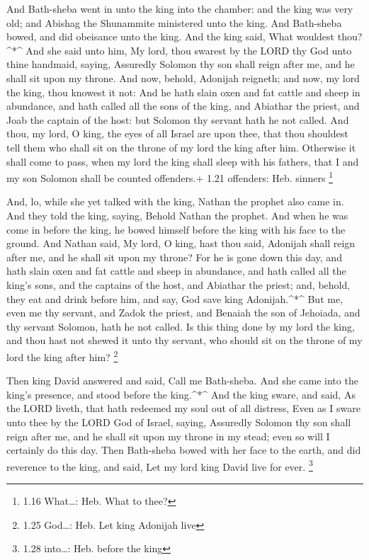 And Bath-sheba went in unto the king into the chamber: and
the king was very old; and Abishag the Shunammite ministered unto the
king.  And Bath-sheba bowed, and did obeisance unto the
king. And the king said, What wouldest thou?\^{}*\^{}  And
she said unto him, My lord, thou swarest by the LORD thy God unto thine
handmaid, saying, Assuredly Solomon thy son shall reign after me, and he
shall sit upon my throne.  And now, behold, Adonijah
reigneth; and now, my lord the king, thou knowest it not: 
And he hath slain oxen and fat cattle and sheep in abundance, and hath
called all the sons of the king, and Abiathar the priest, and Joab the
captain of the host: but Solomon thy servant hath he not called.
 And thou, my lord, O king, the eyes of all Israel are upon
thee, that thou shouldest tell them who shall sit on the throne of my
lord the king after him.  Otherwise it shall come to pass,
when my lord the king shall sleep with his fathers, that I and my son
Solomon shall be counted offenders.+ 1.21 offenders: Heb. sinners
\footnote{1.16 What\ldots: Heb. What to thee?}

 And, lo, while she yet talked with the king, Nathan the
prophet also came in.  And they told the king, saying,
Behold Nathan the prophet. And when he was come in before the king, he
bowed himself before the king with his face to the ground. 
And Nathan said, My lord, O king, hast thou said, Adonijah shall reign
after me, and he shall sit upon my throne?  For he is gone
down this day, and hath slain oxen and fat cattle and sheep in
abundance, and hath called all the king's sons, and the captains of the
host, and Abiathar the priest; and, behold, they eat and drink before
him, and say, God save king Adonijah.\^{}*\^{}  But me,
even me thy servant, and Zadok the priest, and Benaiah the son of
Jehoiada, and thy servant Solomon, hath he not called.  Is
this thing done by my lord the king, and thou hast not shewed it unto
thy servant, who should sit on the throne of my lord the king after him?
\footnote{1.25 God\ldots: Heb. Let king Adonijah live}

 Then king David answered and said, Call me Bath-sheba. And
she came into the king's presence, and stood before the king.\^{}*\^{}
 And the king sware, and said, As the LORD liveth, that
hath redeemed my soul out of all distress,  Even as I sware
unto thee by the LORD God of Israel, saying, Assuredly Solomon thy son
shall reign after me, and he shall sit upon my throne in my stead; even
so will I certainly do this day.  Then Bath-sheba bowed
with her face to the earth, and did reverence to the king, and said, Let
my lord king David live for ever. \footnote{1.28 into\ldots: Heb. before
  the king}

